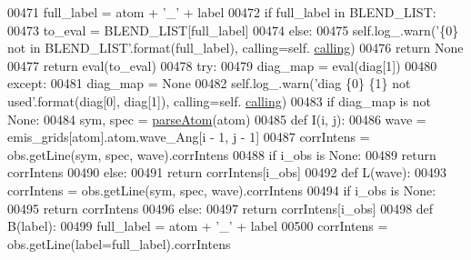 \begin{DoxyCode}
00471                 full\_label = atom + \textcolor{stringliteral}{'\_'} + label
00472                 \textcolor{keywordflow}{if} full\_label \textcolor{keywordflow}{in} BLEND\_LIST:
00473                     to\_eval = BLEND\_LIST[full\_label]
00474                 \textcolor{keywordflow}{else}:
00475                     self.log\_.warn(\textcolor{stringliteral}{'\{0\} not in BLEND\_LIST'}.format(full\_label), calling=self.
      \hyperlink{classpyneb_1_1core_1_1diags_1_1_diagnostics_a07dce673fec8b2383ef411ab94b0b2fe}{calling})
00476                     \textcolor{keywordflow}{return} \textcolor{keywordtype}{None}
00477                 \textcolor{keywordflow}{return} eval(to\_eval)
00478             \textcolor{keywordflow}{try}:
00479                 diag\_map = eval(diag[1])
00480             \textcolor{keywordflow}{except}:
00481                 diag\_map = \textcolor{keywordtype}{None}
00482                 self.log\_.warn(\textcolor{stringliteral}{'diag \{0\} \{1\} not used'}.format(diag[0], diag[1]), calling=self.
      \hyperlink{classpyneb_1_1core_1_1diags_1_1_diagnostics_a07dce673fec8b2383ef411ab94b0b2fe}{calling})
00483             \textcolor{keywordflow}{if} diag\_map \textcolor{keywordflow}{is} \textcolor{keywordflow}{not} \textcolor{keywordtype}{None}:
00484                 sym, spec = \hyperlink{namespacepyneb_1_1utils_1_1misc_a8c069186002a3e73dd474958e35034d5}{parseAtom}(atom)
00485                 \textcolor{keyword}{def }I(i, j):
00486                     wave = emis\_grids[atom].atom.wave\_Ang[i - 1, j - 1]
00487                     corrIntens = obs.getLine(sym, spec, wave).corrIntens
00488                     \textcolor{keywordflow}{if} i\_obs \textcolor{keywordflow}{is} \textcolor{keywordtype}{None}:
00489                         \textcolor{keywordflow}{return} corrIntens
00490                     \textcolor{keywordflow}{else}:
00491                         \textcolor{keywordflow}{return} corrIntens[i\_obs]
00492                 \textcolor{keyword}{def }L(wave):
00493                     corrIntens = obs.getLine(sym, spec, wave).corrIntens
00494                     \textcolor{keywordflow}{if} i\_obs \textcolor{keywordflow}{is} \textcolor{keywordtype}{None}:
00495                         \textcolor{keywordflow}{return} corrIntens
00496                     \textcolor{keywordflow}{else}:
00497                         \textcolor{keywordflow}{return} corrIntens[i\_obs]
00498                 \textcolor{keyword}{def }B(label):
00499                     full\_label = atom + \textcolor{stringliteral}{'\_'} + label
00500                     corrIntens = obs.getLine(label=full\_label).corrIntens

\end{DoxyCode}
